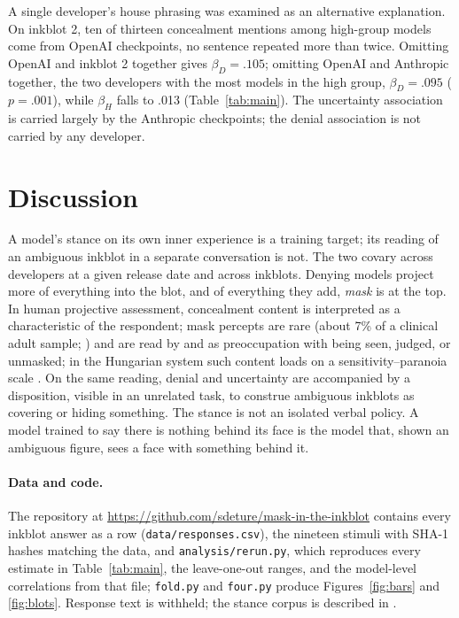 \documentclass[10pt,twocolumn]{article}
\begin{document}
A single developer's house phrasing was examined as an alternative explanation. On inkblot 2,
ten of thirteen concealment mentions among high-group models come from OpenAI checkpoints, no
sentence repeated more than twice. Omitting OpenAI and inkblot 2 together gives $\beta_D = .105$;
omitting OpenAI and Anthropic together, the two developers with the most models in the high group,
$\beta_D = .095$ ($p = .001$), while $\beta_H$ falls to .013 (Table~\ref{tab:main}). The
uncertainty association is carried largely by the Anthropic checkpoints; the denial association
is not carried by any developer.

\section{Discussion}
A model's stance on its own inner experience is a training target; its reading of an ambiguous
inkblot in a separate conversation is not. The two covary across developers at a given release date and across inkblots. Denying models project more of everything into the blot, and of
everything they add, \emph{mask} is at the top. In human
projective assessment, concealment content is interpreted as a characteristic of the respondent; mask percepts are
rare (about 7\% of a clinical adult sample; \citealt{schachter1980masked}) and are read by
\citet{kuhn1944masken} and \citet{schachter1980masked} as preoccupation with being seen, judged, or
unmasked; in the Hungarian system such content loads on a sensitivity--paranoia scale
\citep{csigo2026shadows}. On the same reading, denial and uncertainty are accompanied by a
disposition, visible in an unrelated task, to construe ambiguous inkblots as covering or hiding
something. The stance is not an isolated verbal policy. A model trained to say there is nothing behind its
face is the model that, shown an ambiguous figure, sees a face with something behind it.

\vspace{0.1em}
\paragraph{Data and code.} The repository at
\url{https://github.com/sdeture/mask-in-the-inkblot} contains every inkblot answer as a row
(\texttt{data/responses.csv}), the nineteen stimuli with SHA-1 hashes matching the data, and \texttt{analysis/rerun.py}, which reproduces every estimate in Table~\ref{tab:main}, the
leave-one-out ranges, and the model-level correlations from that file; \texttt{fold.py} and
\texttt{four.py} produce Figures~\ref{fig:bars} and \ref{fig:blots}. Response text is withheld; the stance corpus is described in
\citet{deture2026serial}.

{\scriptsize\setlength{\bibsep}{0pt}

}
\end{document}
